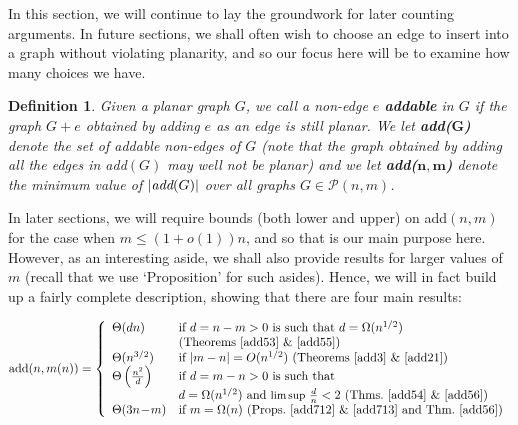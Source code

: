 \documentclass{article}
\newtheorem{Proof of Theorem}{Proof of Theorem}
\newtheorem{Definition}[Theorem]{Definition}
\begin{document}
In this section, 
we will continue to lay the groundwork for later counting arguments.
In future sections,
we shall often wish to choose an edge to insert into a graph without violating planarity,
and so our focus here will be to examine how many choices we have. 

\begin{Definition}
Given a planar graph $G$, we call a non-edge $e$ \emph{\textbf{addable}} in $G$ 
if the graph $G+e$ obtained by adding $e$ as an edge is still planar.
We let \emph{\textbf{add(}$\mathbf{G}$\textbf{)}} denote the set of addable non-edges of $G$ 
(note that the graph obtained by adding all the edges in \emph{add}$(G)$ may well not be planar)
and we let \emph{\textbf{add(}$\mathbf{n,m}$\textbf{)}} 
denote the minimum value of $|\emph{add}(G)|$ over all graphs $G \in \mathcal{P}(n,m)$.
\end{Definition}

In later sections,
we will require bounds (both lower and upper) on add$(n,m)$ for the case when $m \leq (1+o(1))n$,
and so that is our main purpose here.~
However,
as an interesting aside,
we shall also provide results for larger values of $m$
(recall that we use `Proposition' for such asides).
Hence,
we will in fact build up a fairly complete description,
showing that there are four main results: 
\begin{table} [ht] 
\begin{displaymath}
\textrm{add}(n,m(n)) =
\left\{ \begin{array}{ll}
\Theta(dn) & \textrm{if $d=n-m>0$ is such that $d=\Omega(n^{1/2})$} \\
& \textrm{(Theorems~\ref{add53} \&~\ref{add55})}\\
\Theta(n^{3/2}) & \textrm{if $|m-n|=O(n^{1/2})$ (Theorems~\ref{add3} \&~\ref{add21})}\\
\Theta \left( \frac{n^{2}}{d} \right) 
& \textrm{if $d=m-n>0$ is such that} \\
& \textrm{$d=\Omega(n^{1/2})$ and 
\small{$\limsup$} } \frac{d}{n} < 2
\textrm{ (Thms.~\ref{add54} \&~\ref{add56})} \\
\Theta(3n\!-\!m) & \textrm{if $m = \Omega(n)$ (Props.~\ref{add712} \&~\ref{add713} and Thm.~\ref{add56}})
\end{array} \right. 
\end{displaymath} 
\caption{The four main addability results.} \label{addsum1}
\end{table}
\end{document}
